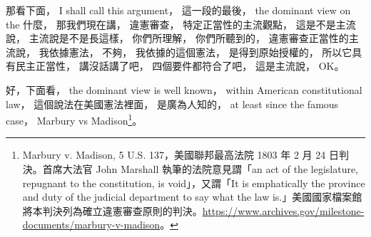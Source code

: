 \hypertarget{w02:cue:1839}{}那看下面，
\hypertarget{w02:cue:1840}{}I shall call this argument，
\hypertarget{w02:cue:1841}{}這一段的最後，
\hypertarget{w02:cue:1842}{}the dominant view on the 什麼，
\hypertarget{w02:cue:1843}{}那我們現在講，
\hypertarget{w02:cue:1844}{}違憲審查，
\hypertarget{w02:cue:1845}{}特定正當性的主流觀點，
\hypertarget{w02:cue:1846}{}這是不是主流說，
\hypertarget{w02:cue:1847}{}主流說是不是長這樣，
\hypertarget{w02:cue:1848}{}你們所理解，
\hypertarget{w02:cue:1849}{}你們所聽到的，
\hypertarget{w02:cue:1850}{}違憲審查正當性的主流說，
\hypertarget{w02:cue:1851}{}我依據憲法，
\hypertarget{w02:cue:1852}{}不夠，
\hypertarget{w02:cue:1853}{}我依據的這個憲法，
\hypertarget{w02:cue:1854}{}是得到原始授權的，
\hypertarget{w02:cue:1855}{}所以它具有民主正當性，
\hypertarget{w02:cue:1856}{}講沒話講了吧，
\hypertarget{w02:cue:1857}{}四個要件都符合了吧，
\hypertarget{w02:cue:1858}{}這是主流說，
\hypertarget{w02:cue:1859}{}OK。

\hypertarget{w02:cue:1860}{}好，下面看，
\hypertarget{w02:cue:1861}{}the dominant view is well known，
\hypertarget{w02:cue:1862}{}within American constitutional law，
\hypertarget{w02:cue:1863}{}這個說法在美國憲法裡面，
\hypertarget{w02:cue:1864}{}是廣為人知的，
\hypertarget{w02:cue:1865}{}at least since the famous case，
\hypertarget{w02:cue:1866}{}Marbury vs Madison\footnote{Marbury v. Madison, 5 U.S. 137，美國聯邦最高法院 1803 年 2 月 24 日判決。首席大法官 John Marshall 執筆的法院意見謂「an act of the legislature, repugnant to the constitution, is void」，又謂「It is emphatically the province and duty of the judicial department to say what the law is.」美國國家檔案館將本判決列為確立違憲審查原則的判決。\url{https://www.archives.gov/milestone-documents/marbury-v-madison}。}。

